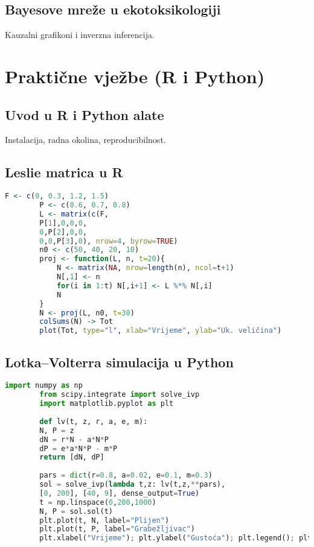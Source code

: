 \documentclass[11pt,oneside]{book}
\newcommand{\R}{\textsf{R}}
\newcommand{\Python}{\textsf{Python}}
\begin{document}
	\section{Bayesove mreže u ekotoksikologiji}
	Kauzalni grafikoni i inverzna inferencija.
	
	\chapter{Praktične vježbe (\R{} i \Python{})}
	\section{Uvod u \R{} i \Python{} alate}
	Instalacija, radna okolina, reproducibilnost.
	\section{Leslie matrica u \R{}}
	\begin{lstlisting}[language=R,caption={Leslie matrica i projekcija populacije u R-u}]
		F <- c(0, 0.3, 1.2, 1.5)
		P <- c(0.6, 0.7, 0.8)
		L <- matrix(c(F,
		P[1],0,0,0,
		0,P[2],0,0,
		0,0,P[3],0), nrow=4, byrow=TRUE)
		n0 <- c(50, 40, 20, 10)
		proj <- function(L, n, t=20){
			N <- matrix(NA, nrow=length(n), ncol=t+1)
			N[,1] <- n
			for(i in 1:t) N[,i+1] <- L %*% N[,i]
			N
		}
		N <- proj(L, n0, t=30)
		colSums(N) -> Tot
		plot(Tot, type="l", xlab="Vrijeme", ylab="Uk. veličina")
	\end{lstlisting}
	
	\section{Lotka--Volterra simulacija u \Python{}}
	\begin{lstlisting}[language=Python,caption={Jednostavni LV model u Pythonu (scipy.integrate)}]
		import numpy as np
		from scipy.integrate import solve_ivp
		import matplotlib.pyplot as plt
		
		def lv(t, z, r, a, e, m):
		N, P = z
		dN = r*N - a*N*P
		dP = e*a*N*P - m*P
		return [dN, dP]
		
		pars = dict(r=0.8, a=0.02, e=0.1, m=0.3)
		sol = solve_ivp(lambda t,z: lv(t,z,**pars),
		[0, 200], [40, 9], dense_output=True)
		t = np.linspace(0,200,1000)
		N, P = sol.sol(t)
		plt.plot(t, N, label="Plijen")
		plt.plot(t, P, label="Grabežljivac")
		plt.xlabel("Vrijeme"); plt.ylabel("Gustoća"); plt.legend(); plt.show()
	\end{lstlisting}
	
\end{document}
